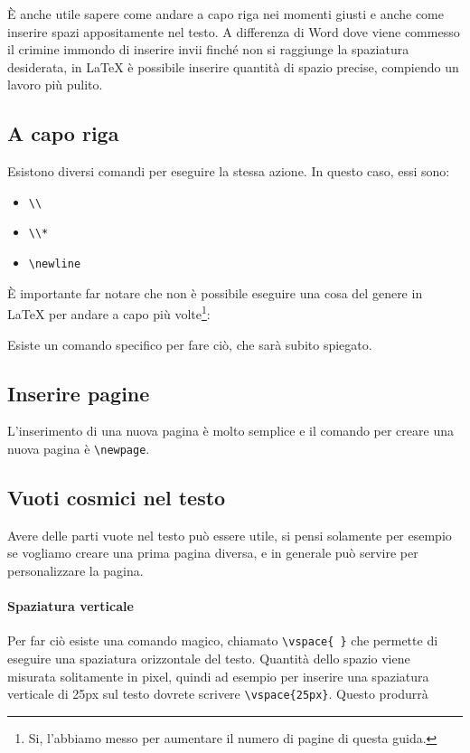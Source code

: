 È anche utile sapere come andare a capo riga nei momenti giusti e anche come
inserire spazi appositamente nel testo. A differenza di Word dove viene
commesso il crimine immondo di inserire invii finché non si raggiunge la
spaziatura desiderata, in \LaTeX{} è possibile inserire quantità di spazio
precise, compiendo un lavoro più pulito.

\subsection{A capo riga}

Esistono diversi comandi per eseguire la stessa azione. In questo caso, essi
sono:
\begin{itemize}
 \item \verb!\\!
 \item \verb!\\*!
 \item \verb!\newline!
\end{itemize}

È importante far notare che non è possibile eseguire una cosa del genere in
\LaTeX{} per andare a capo più volte\footnote{Si, l'abbiamo messo per
aumentare il numero di pagine di questa guida.}:



Esiste un comando specifico per fare ciò, che sarà subito spiegato.

\subsection{Inserire pagine}

L'inserimento di una nuova pagina è molto semplice e il comando per creare una
nuova pagina è \verb!\newpage!.

\subsection{Vuoti cosmici nel testo}

Avere delle parti vuote nel testo può essere utile, si pensi solamente per
esempio se vogliamo creare una prima pagina diversa, e in generale può servire
per personalizzare la pagina.

\paragraph*{Spaziatura verticale} Per far ciò esiste una comando magico,
chiamato \verb!\vspace{ }! che permette di eseguire una spaziatura orizzontale
del testo. Quantità dello spazio viene misurata solitamente in pixel, quindi ad
esempio per inserire una spaziatura verticale di 25px sul testo dovrete
scrivere \verb!\vspace{25px}!. Questo produrrà

